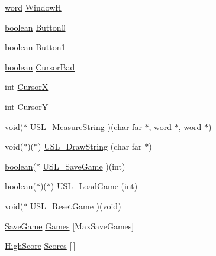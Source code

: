 \begin{DoxyCompactItemize}
\item 
\hyperlink{ID__HEAD_8H_abad51e07ab6d26bec9f1f786c8d65bcd}{word} \hyperlink{ID__US_8H_aaeba48e7e4c3c27582d73da5718a0c0c}{WindowH}
\item 
\hyperlink{ID__HEAD_8H_a7c6368b321bd9acd0149b030bb8275ed}{boolean} \hyperlink{ID__US_8H_a7fa08780907017f971b2dc0909bd77fd}{Button0}
\item 
\hyperlink{ID__HEAD_8H_a7c6368b321bd9acd0149b030bb8275ed}{boolean} \hyperlink{ID__US_8H_aca6b2fe999220340d0569ece03a0026d}{Button1}
\item 
\hyperlink{ID__HEAD_8H_a7c6368b321bd9acd0149b030bb8275ed}{boolean} \hyperlink{ID__US_8H_abf5358251c5b519d71e3d8bca8256510}{CursorBad}
\item 
int \hyperlink{ID__US_8H_af51730b2758fe5daa55ca8445a8f7c3b}{CursorX}
\item 
int \hyperlink{ID__US_8H_a7f5c998973d0526fcb8d52f37e5547da}{CursorY}
\item 
void($\ast$ \hyperlink{ID__US_8H_ac392829f8abc2e03447a6abf023352b1}{USL\_\-MeasureString} )(char far $\ast$, \hyperlink{ID__HEAD_8H_abad51e07ab6d26bec9f1f786c8d65bcd}{word} $\ast$, \hyperlink{ID__HEAD_8H_abad51e07ab6d26bec9f1f786c8d65bcd}{word} $\ast$)
\item 
void($\ast$)($\ast$) \hyperlink{ID__US_8H_a49825cde2ac607e0d17407fb33f14a00}{USL\_\-DrawString} (char far $\ast$)
\item 
\hyperlink{ID__HEAD_8H_a7c6368b321bd9acd0149b030bb8275ed}{boolean}($\ast$ \hyperlink{ID__US_8H_a26a6bc7aa90c2c828190df5c67db8692}{USL\_\-SaveGame} )(int)
\item 
\hyperlink{ID__HEAD_8H_a7c6368b321bd9acd0149b030bb8275ed}{boolean}($\ast$)($\ast$) \hyperlink{ID__US_8H_a929fff4158aee7d4a88ffc63c52817f1}{USL\_\-LoadGame} (int)
\item 
void($\ast$ \hyperlink{ID__US_8H_a7ac3fe59ccca28a6946051e6dc90b372}{USL\_\-ResetGame} )(void)
\item 
\hyperlink{structSaveGame}{SaveGame} \hyperlink{ID__US_8H_a155f9931f0842c8f97f962eef9cd22f7}{Games} \mbox{[}MaxSaveGames\mbox{]}
\item 
\hyperlink{structHighScore}{HighScore} \hyperlink{ID__US_8H_a83f5d32c01cb878eee4eb39ef5b9d323}{Scores} \mbox{[}$\,$\mbox{]}
\end{DoxyCompactItemize}


